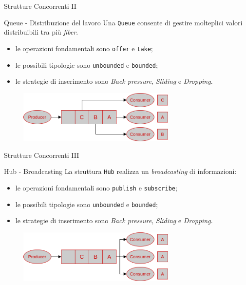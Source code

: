 \begin{frame}{Strutture Concorrenti II}
  \begin{block}{Queue - Distribuzione del lavoro}
    Una \texttt{Queue} consente di gestire molteplici valori distribuibili tra più \textit{fiber}.
     \begin{itemize}
      \item le operazioni fondamentali sono \texttt{offer} e \texttt{take};
      \item le possibili tipologie sono \texttt{unbounded} e \texttt{bounded};
      \item le strategie di inserimento sono \textit{Back pressure}, \textit{Sliding} e \textit{Dropping}.
     \end{itemize}
  \end{block}
  
  \begin{figure}
    \centering
    \includegraphics[width=0.7\textwidth]{img/queue.png}
    \label{distributing with queue.}
  \end{figure}


\end{frame}

\begin{frame}{Strutture Concorrenti III}
  \begin{block}{Hub - Broadcasting}
    La struttura \texttt{Hub} realizza un \textit{broadcasting} di informazioni:
    \begin{itemize}
      \item le operazioni fondamentali sono \texttt{publish} e \texttt{subscribe};
      \item le possibili tipologie sono \texttt{unbounded} e \texttt{bounded};
      \item le strategie di inserimento sono \textit{Back pressure}, \textit{Sliding} e \textit{Dropping}.
    \end{itemize}
  \end{block}
  \begin{figure}
    \centering
    \includegraphics[width=0.7\textwidth]{img/hub.png}
    \label{broadcasting with hub.}
  \end{figure}
\end{frame}

